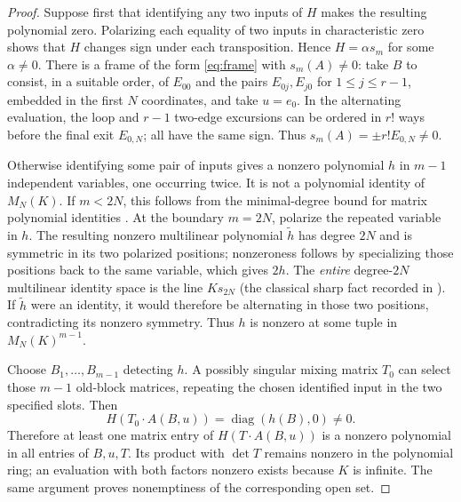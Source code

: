 \documentclass[11pt,reqno]{amsart}
\theoremstyle{plain}
\theoremstyle{definition}
\numberwithin{equation}{section}
\begin{document}
\begin{proof}
Suppose first that identifying any two inputs of $H$ makes the resulting polynomial zero.  Polarizing each equality of two inputs in characteristic zero shows that $H$ changes sign under each transposition.  Hence $H=\alpha s_m$ for some $\alpha\ne0$.  There is a frame of the form \eqref{eq:frame} with $s_m(A)\ne0$: take $B$ to consist, in a suitable order, of $E_{00}$ and the pairs $E_{0j},E_{j0}$ for $1\le j\le r-1$, embedded in the first $N$ coordinates, and take $u=e_0$.  In the alternating evaluation, the loop and $r-1$ two-edge excursions can be ordered in $r!$ ways before the final exit $E_{0,N}$; all have the same sign.  Thus $s_m(A)=\pm r!E_{0,N}\ne0$.

Otherwise identifying some pair of inputs gives a nonzero polynomial $h$ in $m-1$ independent variables, one occurring twice.  It is not a polynomial identity of $M_N(K)$.  If $m<2N$, this follows from the minimal-degree bound for matrix polynomial identities \cite{AL1950}.  At the boundary $m=2N$, polarize the repeated variable in $h$.  The resulting nonzero multilinear polynomial $\widetilde h$ has degree $2N$ and is symmetric in its two polarized positions; nonzeroness follows by specializing those positions back to the same variable, which gives $2h$.  The \emph{entire} degree-$2N$ multilinear identity space is the line $Ks_{2N}$ (the classical sharp fact recorded in \cite[pp.~175--176]{Leron1973}).  If $\widetilde h$ were an identity, it would therefore be alternating in those two positions, contradicting its nonzero symmetry.  Thus $h$ is nonzero at some tuple in $M_N(K)^{m-1}$.

Choose $B_1,\ldots,B_{m-1}$ detecting $h$.  A possibly singular mixing matrix $T_0$ can select those $m-1$ old-block matrices, repeating the chosen identified input in the two specified slots.  Then
\[
 H(T_0\cdot A(B,u))=\operatorname{diag}(h(B),0)\ne0.
\]
Therefore at least one matrix entry of $H(T\cdot A(B,u))$ is a nonzero polynomial in all entries of $B,u,T$.  Its product with $\det T$ remains nonzero in the polynomial ring; an evaluation with both factors nonzero exists because $K$ is infinite.  The same argument proves nonemptiness of the corresponding open set.
\end{proof}
\end{document}
